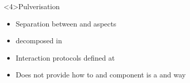 \begin{frame}<4>{Pulverisation}
  \begin{cardTiny}
    \begin{itemize}[<+->]
      \item Separation between  and  aspects
      \item {} decomposed in 
      \item Interaction protocols defined at 
      \item[\failure{\faThumbsDown}] Does not provide how to  and  component is a  and  way
    \end{itemize}
  \end{cardTiny}
  \begin{columns}
    \begin{column}{0.45\textwidth}
    \end{column}
    \begin{column}{0.38\textwidth}
    \end{column}
  \end{columns}
\end{frame}